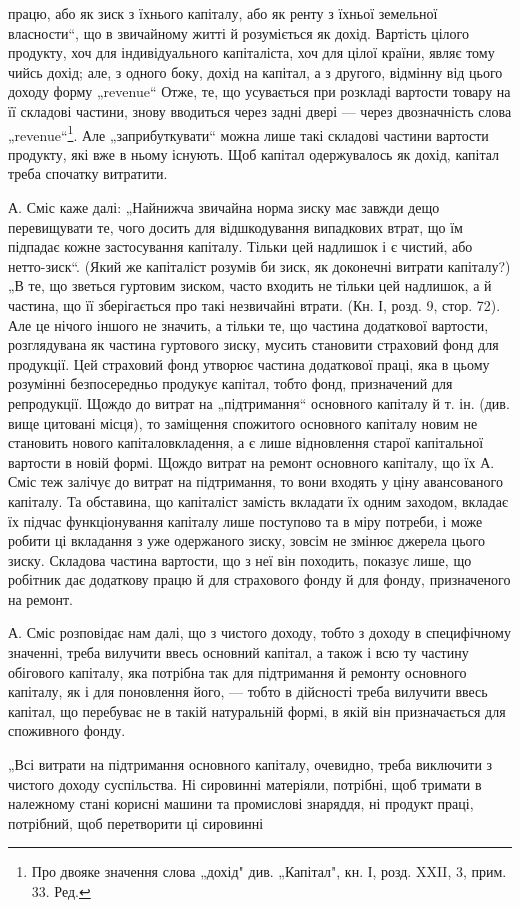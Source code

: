 працю, або як зиск з їхнього капіталу, або як ренту з їхньої земельної
власности“, що в звичайному житті й розуміється як дохід. Вартість
цілого продукту, хоч для індивідуального капіталіста, хоч для цілої країни,
являє тому чийсь дохід; але, з одного боку, дохід на капітал, а з другого,
відмінну від цього доходу форму „revenue“ Отже, те, що усувається при
розкладі вартости товару на її складові частини, знову вводиться через
задні двері — через двозначність слова „revenue“\footnote*{
Про двояке значення слова „дохід" див. „Капітал", кн. І, розд. XXII, 3,
прим. 33. Ред.
}. Але „заприбуткувати“
можна лише такі складові частини вартости продукту, які вже в ньому
існують. Щоб капітал одержувалось як дохід, капітал треба спочатку
витратити.

А. Сміс каже далі: „Найнижча звичайна норма зиску має завжди
дещо перевищувати те, чого досить для відшкодування випадкових втрат,
що їм підпадає кожне застосування капіталу. Тільки цей надлишок і є
чистий, або нетто-зиск“. (Який же капіталіст розумів би зиск, як
доконечні витрати капіталу?) „В те, що зветься гуртовим зиском, часто
входить не тільки цей надлишок, а й частина, що її зберігається про
такі незвичайні втрати. (Кн. І, розд. 9, стор. 72). Але це нічого іншого
не значить, а тільки те, що частина додаткової вартости, розглядувана
як частина гуртового зиску, мусить становити страховий фонд для продукції.
Цей страховий фонд утворює частина додаткової праці, яка в
цьому розумінні безпосередньо продукує капітал, тобто фонд, призначений
для репродукції. Щождо до витрат на „підтримання“ основного
капіталу й т. ін. (див. вище цитовані місця), то заміщення спожитого
основного капіталу новим не становить нового капіталовкладення, а є
лише відновлення старої капітальної вартости в новій формі. Щождо
витрат на ремонт основного капіталу, що їх А. Сміс теж залічує до витрат
на підтримання, то вони входять у ціну авансованого капіталу.
Та обставина, що капіталіст замість вкладати їх одним заходом, вкладає
їх підчас функціонування капіталу лише поступово та в міру потреби,
і може робити ці вкладання з уже одержаного зиску, зовсім не змінює
джерела цього зиску. Складова частина вартости, що з неї він походить,
показує лише, що робітник дає додаткову працю й для страхового фонду
й для фонду, призначеного на ремонт.

А. Сміс розповідає нам далі, що з чистого доходу, тобто з доходу в
специфічному значенні, треба вилучити ввесь основний капітал, а також і
всю ту частину обігового капіталу, яка потрібна так для підтримання й
ремонту основного капіталу, як і для поновлення його, — тобто в дійсності
треба вилучити ввесь капітал, що перебуває не в такій натуральній
формі, в якій він призначається для споживного фонду.

„Всі витрати на підтримання основного капіталу, очевидно, треба
виключити з чистого доходу суспільства. Ні сировинні матеріяли, потрібні,
щоб тримати в належному стані корисні машини та промислові
знаряддя, ні продукт праці, потрібний, щоб перетворити ці сировинні